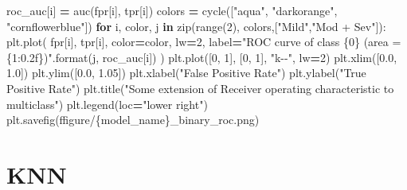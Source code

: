 \documentclass[12pt,twoside]{deuthesis}
\newenvironment{Shaded}{\begin{snugshade}}{\end{snugshade}}
\newcommand{\BuiltInTok}[1]{#1}
\newcommand{\ControlFlowTok}[1]{\textcolor[rgb]{0.13,0.29,0.53}{\textbf{#1}}}
\newcommand{\DecValTok}[1]{\textcolor[rgb]{0.00,0.00,0.81}{#1}}
\newcommand{\FloatTok}[1]{\textcolor[rgb]{0.00,0.00,0.81}{#1}}
\newcommand{\KeywordTok}[1]{\textcolor[rgb]{0.13,0.29,0.53}{\textbf{#1}}}
\newcommand{\NormalTok}[1]{#1}
\newcommand{\OperatorTok}[1]{\textcolor[rgb]{0.81,0.36,0.00}{\textbf{#1}}}
\newcommand{\SpecialCharTok}[1]{\textcolor[rgb]{0.00,0.00,0.00}{#1}}
\newcommand{\SpecialStringTok}[1]{\textcolor[rgb]{0.31,0.60,0.02}{#1}}
\newcommand{\StringTok}[1]{\textcolor[rgb]{0.31,0.60,0.02}{#1}}
\begin{document}
\begin{Shaded}
\begin{Highlighting}[]
\NormalTok{        roc\_auc[i] }\OperatorTok{=}\NormalTok{ auc(fpr[i], tpr[i])}
\NormalTok{    colors }\OperatorTok{=}\NormalTok{ cycle([}\StringTok{"aqua"}\NormalTok{, }\StringTok{"darkorange"}\NormalTok{, }\StringTok{"cornflowerblue"}\NormalTok{])}
    \ControlFlowTok{for}\NormalTok{ i, color, j }\KeywordTok{in} \BuiltInTok{zip}\NormalTok{(}\BuiltInTok{range}\NormalTok{(}\DecValTok{2}\NormalTok{), colors,[}\StringTok{"Mild"}\NormalTok{,}\StringTok{"Mod + Sev"}\NormalTok{]):}
\NormalTok{        plt.plot(}
\NormalTok{        fpr[i],}
\NormalTok{        tpr[i],}
\NormalTok{        color}\OperatorTok{=}\NormalTok{color,}
\NormalTok{        lw}\OperatorTok{=}\DecValTok{2}\NormalTok{,}
\NormalTok{        label}\OperatorTok{=}\StringTok{"ROC curve of class }\SpecialCharTok{\{0\}}\StringTok{ (area = }\SpecialCharTok{\{1:0.2f\}}\StringTok{)"}\NormalTok{.}\BuiltInTok{format}\NormalTok{(j, roc\_auc[i])}
\NormalTok{        )}
\NormalTok{    plt.plot([}\DecValTok{0}\NormalTok{, }\DecValTok{1}\NormalTok{], [}\DecValTok{0}\NormalTok{, }\DecValTok{1}\NormalTok{], }\StringTok{"k{-}{-}"}\NormalTok{, lw}\OperatorTok{=}\DecValTok{2}\NormalTok{)}
\NormalTok{    plt.xlim([}\FloatTok{0.0}\NormalTok{, }\FloatTok{1.0}\NormalTok{])}
\NormalTok{    plt.ylim([}\FloatTok{0.0}\NormalTok{, }\FloatTok{1.05}\NormalTok{])}
\NormalTok{    plt.xlabel(}\StringTok{"False Positive Rate"}\NormalTok{)}
\NormalTok{    plt.ylabel(}\StringTok{"True Positive Rate"}\NormalTok{)}
\NormalTok{    plt.title(}\StringTok{"Some extension of Receiver operating characteristic to multiclass"}\NormalTok{)}
\NormalTok{    plt.legend(loc}\OperatorTok{=}\StringTok{"lower right"}\NormalTok{)}
\NormalTok{    plt.savefig(}\SpecialStringTok{f\textquotesingle{}figure/}\SpecialCharTok{\{}\NormalTok{model\_name}\SpecialCharTok{\}}\SpecialStringTok{\_binary\_roc.png\textquotesingle{}}\NormalTok{)}
\end{Highlighting}
\end{Shaded}
\normalsize

\hypertarget{knn-2}{%
\section{KNN}\label{knn-2}}
\end{document}
